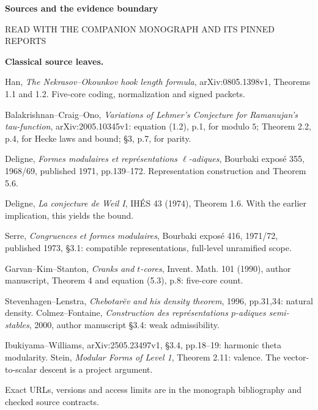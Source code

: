 \documentclass[11pt]{article}
\begin{document}

\clearpage
{\fontsize{22}{26}\selectfont\bfseries\color{Ink}Sources and the evidence boundary}\par
{\sffamily\small\color{Gray}READ WITH THE COMPANION MONOGRAPH AND ITS PINNED REPORTS}\par
\vspace{3mm}
\begin{minipage}[t]{0.48\linewidth}\vspace{0pt}\small
\textbf{Classical source leaves.}\par
Han, \emph{The Nekrasov--Okounkov hook length formula}, arXiv:0805.1398v1, Theorems 1.1 and 1.2. Five-core coding, normalization and signed packets.\par
Balakrishnan--Craig--Ono, \emph{Variations of Lehmer's Conjecture for Ramanujan's tau-function}, arXiv:2005.10345v1: equation (1.2), p.1, for modulo $5$; Theorem 2.2, p.4, for Hecke laws and bound; \S3, p.7, for parity.\par
Deligne, \emph{Formes modulaires et repr\'esentations $\ell$-adiques}, Bourbaki expos\'e 355, 1968/69, published 1971, pp.139--172. Representation construction and Theorem 5.6.\par
Deligne, \emph{La conjecture de Weil I}, IH\'ES 43 (1974), Theorem 1.6. With the earlier implication, this yields the bound.\par
Serre, \emph{Congruences et formes modulaires}, Bourbaki expos\'e 416, 1971/72, published 1973, \S3.1: compatible representations, full-level unramified scope.\par
Garvan--Kim--Stanton, \emph{Cranks and $t$-cores}, Invent. Math. 101 (1990), author manuscript, Theorem 4 and equation (5.3), p.8: five-core count.\par
Stevenhagen--Lenstra, \emph{Chebotar\"ev and his density theorem}, 1996, pp.31,34: natural density. Colmez--Fontaine, \emph{Construction des repr\'esentations $p$-adiques semi-stables}, 2000, author manuscript \S3.4: weak admissibility.\par
Ibukiyama--Williams, arXiv:2505.23497v1, \S3.4, pp.18--19: harmonic theta modularity. Stein, \emph{Modular Forms of Level 1}, Theorem 2.11: valence. The vector-to-scalar descent is a project argument.\par
Exact URLs, versions and access limits are in the monograph bibliography and checked source contracts.
\end{minipage}\hfill
\end{document}
